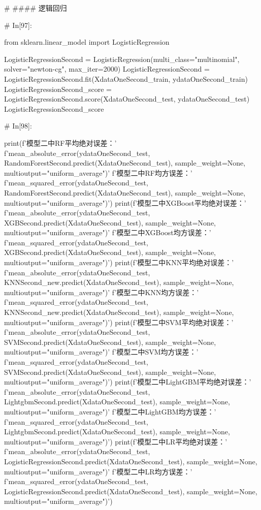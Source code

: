 \documentclass{MathorCupmodeling}
\begin{document}
\begin{python}
	# #### 逻辑回归
	
	# In[97]:
	
	
	from sklearn.linear_model import LogisticRegression
	
	LogisticRegressionSecond = LogisticRegression(multi_class="multinomial", solver="newton-cg", max_iter=2000)
	LogisticRegressionSecond = LogisticRegressionSecond.fit(XdataOneSecond_train, ydataOneSecond_train)
	LogisticRegressionSecond_score = LogisticRegressionSecond.score(XdataOneSecond_test, ydataOneSecond_test)
	LogisticRegressionSecond_score
	
	# In[98]:
	
	
	print(f'模型二中RF平均绝对误差：'
		  f'{mean_absolute_error(ydataOneSecond_test, RandomForestSecond.predict(XdataOneSecond_test), sample_weight=None, multioutput="uniform_average")}\n'
		  f'模型二中RF均方误差：'
		  f'{mean_squared_error(ydataOneSecond_test, RandomForestSecond.predict(XdataOneSecond_test), sample_weight=None, multioutput="uniform_average")}')
	print(f'模型二中XGBoost平均绝对误差：'
		  f'{mean_absolute_error(ydataOneSecond_test, XGBSecond.predict(XdataOneSecond_test), sample_weight=None, multioutput="uniform_average")}\n'
		  f'模型二中XGBoost均方误差：'
		  f'{mean_squared_error(ydataOneSecond_test, XGBSecond.predict(XdataOneSecond_test), sample_weight=None, multioutput="uniform_average")}')
	print(f'模型二中KNN平均绝对误差：'
		  f'{mean_absolute_error(ydataOneSecond_test, KNNSecond_new.predict(XdataOneSecond_test), sample_weight=None, multioutput="uniform_average")}\n'
		  f'模型二中KNN均方误差：'
		  f'{mean_squared_error(ydataOneSecond_test, KNNSecond_new.predict(XdataOneSecond_test), sample_weight=None, multioutput="uniform_average")}')
	print(f'模型二中SVM平均绝对误差：'
		  f'{mean_absolute_error(ydataOneSecond_test, SVMSecond.predict(XdataOneSecond_test), sample_weight=None, multioutput="uniform_average")}\n'
		  f'模型二中SVM均方误差：'
		  f'{mean_squared_error(ydataOneSecond_test, SVMSecond.predict(XdataOneSecond_test), sample_weight=None, multioutput="uniform_average")}')
	print(f'模型二中LightGBM平均绝对误差：'
		  f'{mean_absolute_error(ydataOneSecond_test, LightgbmSecond.predict(XdataOneSecond_test), sample_weight=None, multioutput="uniform_average")}\n'
		  f'模型二中LightGBM均方误差：'
		  f'{mean_squared_error(ydataOneSecond_test, LightgbmSecond.predict(XdataOneSecond_test), sample_weight=None, multioutput="uniform_average")}')
	print(f'模型二中LR平均绝对误差：'
		  f'{mean_absolute_error(ydataOneSecond_test, LogisticRegressionSecond.predict(XdataOneSecond_test), sample_weight=None, multioutput="uniform_average")}\n'
		  f'模型二中LR均方误差：'
		  f'{mean_squared_error(ydataOneSecond_test, LogisticRegressionSecond.predict(XdataOneSecond_test), sample_weight=None, multioutput="uniform_average")}')
	

\end{python}
\end{document}
